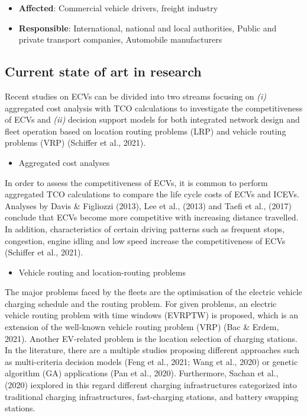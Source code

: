 \documentclass[
]{book}
\providecommand{\tightlist}{%
  \setlength{\itemsep}{0pt}\setlength{\parskip}{0pt}}
\begin{document}
\begin{itemize}
\tightlist
\item
  \textbf{Affected}: Commercial vehicle drivers, freight industry
\item
  \textbf{Responsible}: International, national and local authorities, Public and private transport companies, Automobile manufacturers
\end{itemize}

\hypertarget{current-state-of-art-in-research-27}{%
\subsection*{Current state of art in research}\label{current-state-of-art-in-research-27}}

Recent studies on ECVs can be divided into two streams focusing on \emph{(i)} aggregated cost analysis with TCO calculations to investigate the competitiveness of ECVs and \emph{(ii)} decision support models for both integrated network design and fleet operation based on location routing problems (LRP) and vehicle routing problems (VRP) (Schiffer et al., 2021).

\begin{itemize}
\tightlist
\item
  Aggregated cost analyses
\end{itemize}

In order to assess the competitiveness of ECVs, it is common to perform aggregated TCO calculations to compare the life cycle costs of ECVs and ICEVs. Analyses by Davis \& Figliozzi (2013), Lee et al., (2013) and Taefi et al., (2017) conclude that ECVs become more competitive with increasing distance travelled. In addition, characteristics of certain driving patterns such as frequent stops, congestion, engine idling and low speed increase the competitiveness of ECVs (Schiffer et al., 2021).

\begin{itemize}
\tightlist
\item
  Vehicle routing and location-routing problems
\end{itemize}

The major problems faced by the fleets are the optimisation of the electric vehicle charging schedule and the routing problem. For given problems, an electric vehicle routing problem with time windows (EVRPTW) is proposed, which is an extension of the well-known vehicle routing problem (VRP) (Bac \& Erdem, 2021). Another EV-related problem is the location selection of charging stations. In the literature, there are a multiple studies proposing different approaches such as multi-criteria decision models (Feng et al., 2021; Wang et al., 2020) or genetic algorithm (GA) applications (Pan et al., 2020). Furthermore, Sachan et al., (2020) iexplored in this regard different charging infrastructures categorized into traditional charging infrastructures, fast-charging stations, and battery swapping stations.
\end{document}
